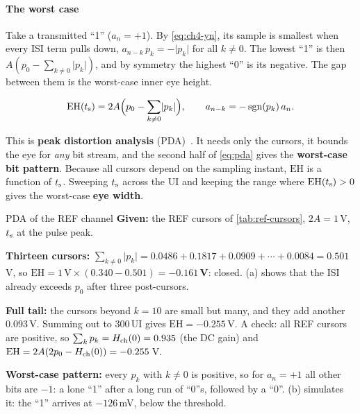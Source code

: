 \paragraph{The worst case}
Take a transmitted ``1'' ($a_n = +1$). By \cref{eq:ch4-yn}, its sample is smallest when every ISI term pulls down, $a_{n-k}\,p_k = -\lvert p_k\rvert$ for all $k \ne 0$. The lowest ``1'' is then $A(p_0 - \sum_{k\neq0}\lvert p_k\rvert)$, and by symmetry the highest ``0'' is its negative. The gap between them is the worst-case inner eye height.

\begin{keyeq}
\begin{equation}
  \mathrm{EH}(t_\mathrm{s}) = 2A\Big(p_0 - \sum_{k\neq0}\lvert p_k\rvert\Big),
  \qquad
  a_{n-k} = -\operatorname{sgn}(p_k)\,a_n .
  \label{eq:pda}
\end{equation}
\end{keyeq}
This is \textbf{peak distortion analysis} (PDA)~\citep{p2:casper2002,palermo720ch}. It needs only the cursors, it bounds the eye for \emph{any} bit stream, and the second half of \cref{eq:pda} gives the \textbf{worst-case bit pattern}. Because all cursors depend on the sampling instant, $\mathrm{EH}$ is a function of $t_\mathrm{s}$. Sweeping $t_\mathrm{s}$ across the UI and keeping the range where $\mathrm{EH}(t_\mathrm{s}) > 0$ gives the worst-case \textbf{eye width}.

\begin{example}{PDA of the REF channel}\label{we:ch4-pda}
\textbf{Given:} the REF cursors of \cref{tab:ref-cursors}, $2A = 1$\,V, $t_\mathrm{s}$ at the pulse peak.

\textbf{Thirteen cursors:} $\sum_{k\neq0}\lvert p_k\rvert = 0.0486 + 0.1817 + 0.0909 + \cdots + 0.0084 = 0.501$\,V, so $\mathrm{EH} = 1\,\mathrm{V}\times(0.340 - 0.501) = \mathbf{-0.161\,V}$: closed. (a) shows that the ISI already exceeds $p_0$ after three post-cursors.

\textbf{Full tail:} the cursors beyond $k = 10$ are small but many, and they add another 0.093\,V. Summing out to 300\,UI gives $\mathrm{EH} = -0.255$\,V. A check: all REF cursors are positive, so $\sum_k p_k = H_\mathrm{ch}(0) = 0.935$ (the DC gain) and $\mathrm{EH} = 2A(2p_0 - H_\mathrm{ch}(0)) = -0.255$\,V.

\textbf{Worst-case pattern:} every $p_k$ with $k \neq 0$ is positive, so for $a_n = +1$ all other bits are $-1$: a lone ``1'' after a long run of ``0''s, followed by a ``0''. (b) simulates it: the ``1'' arrives at $-126$\,mV, below the threshold.
\end{example}


